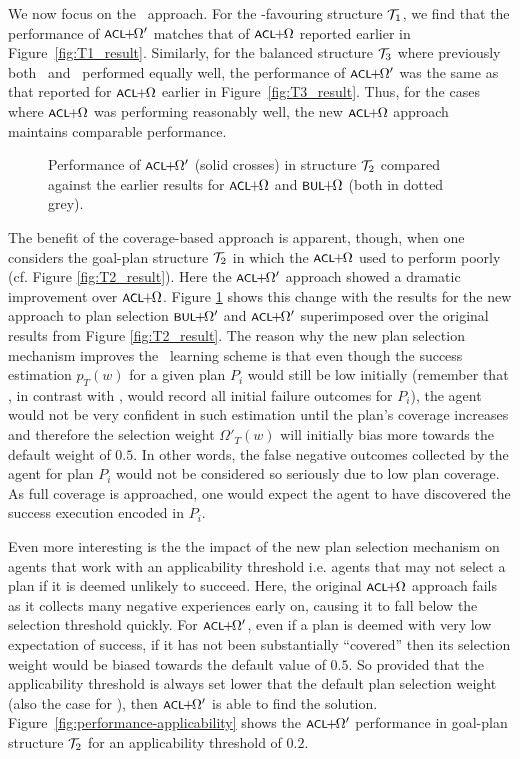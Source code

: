We now focus on the \CL\ approach.
For the \CL-favouring structure ${\mathcal{T}}_1$, we find that the performance of $\CLSELB$ matches that
of $\CLSELA$ reported earlier in Figure~\ref{fig:T1_result}.
Similarly, for the balanced structure ${\mathcal{T}}_3$ where previously both \CL\ and
\BUL\ performed equally well, the performance of $\CLSELB$
was the same as that reported for $\CLSELA$ earlier in Figure~\ref{fig:T3_result}.
Thus, for the cases where $\CLSELA$ was performing reasonably well, the new $\CLSELA$ approach maintains comparable performance.

\begin{figure}[t]
\begin{center}

\caption{Performance of $\CLSELB$ (solid crosses) in structure ${\mathcal{T}}_2$ compared against
the earlier results for $\CLSELA$ and $\BULSELA$ (both in dotted grey).}
\label{fig:T2_result2}
\end{center}
\end{figure}

The benefit of the coverage-based approach is apparent, though, when one considers the goal-plan
structure ${\mathcal{T}}_2$ in which the $\CLSELA$ used to perform poorly (cf. Figure
\ref{fig:T2_result}).
Here the $\CLSELB$ approach showed a dramatic improvement over
$\CLSELA$. Figure \ref{fig:T2_result2} shows this change with the results
for the new approach to plan selection $\BULSELB$ and $\CLSELB$ superimposed over
the original results from Figure \ref{fig:T2_result}.
The reason why the new plan selection mechanism improves the \CL\ learning scheme
is that even though the success estimation $p_T(w)$ for a given plan $P_i$ would still be low
initially (remember that \CL, in contrast with \BUL, would record all initial
failure outcomes for $P_i$), the agent would not be very confident in such
estimation until the plan's coverage increases and therefore the selection weight 
$\Omega'_T(w)$ will initially bias more towards the default weight of $0.5$.
In other words, the false negative outcomes collected by the agent for plan $P_i$ would not be considered
so seriously due to low plan coverage. As full coverage is approached, one would
expect the agent to have discovered the success execution encoded in $P_i$.


Even more interesting is the the impact of the new plan selection mechanism on
agents that work with an applicability threshold i.e. agents that may not
select a plan if it is deemed unlikely to succeed. 
%
Here, the original $\CLSELA$ approach fails as it collects many negative experiences early on, causing it to fall below the selection threshold quickly. 
For $\CLSELB$, even if a plan is deemed with very low expectation of success, if it
has not been substantially ``covered'' then its selection weight would be biased towards the
default value of $0.5$. So provided that the applicability threshold is always set lower that the default plan selection weight (also the case for \BUL), then $\CLSELB$ is able to find the solution.
Figure~\ref{fig:performance-applicability} shows the $\CLSELB$ performance in goal-plan structure ${\mathcal{T}}_2$ for an applicability threshold of $0.2$.


